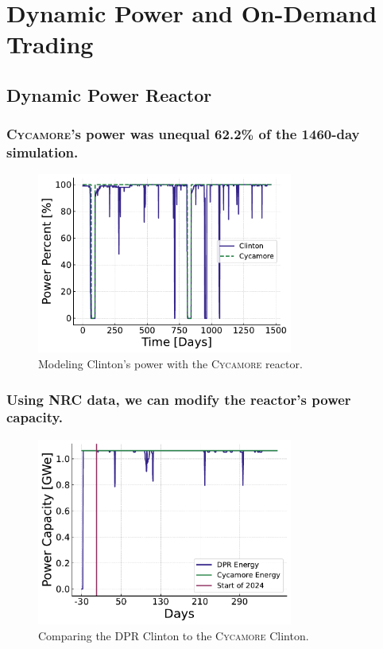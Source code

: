 \documentclass[9pt]{beamer}
\newcommand{\cycamore}{\textsc{Cycamore}\xspace}
\begin{document}
\section{Dynamic Power and On-Demand Trading}

\subsection{Dynamic Power Reactor}
\begin{frame}
  \frametitle{\cycamore's power was unequal 62.2\% of the 1460-day simulation.}
  \begin{figure}
    \centering
    \includegraphics[width=0.75\textwidth]{images/power_percent_clinton_fake.pdf}
    \caption{Modeling Clinton's power with the \cycamore reactor.}
  \end{figure}
\end{frame}

\begin{frame}
  \frametitle{Using NRC data, we can modify the reactor's power capacity.}
  \begin{figure}
    \centering
    \includegraphics[width=0.75\textwidth]{images/dpr_cycamore_energy.pdf}
    \caption{Comparing the DPR Clinton to the \cycamore Clinton.}
  \end{figure}
\end{frame}
\end{document}
